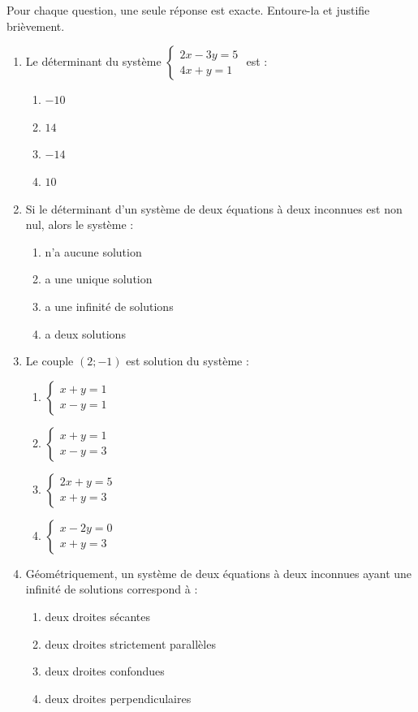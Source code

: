 \documentclass[11pt]{article}
\begin{document}
\begin{exercice}
Pour chaque question, une seule réponse est exacte. Entoure-la et justifie brièvement.
\begin{enumerate}
\item Le déterminant du système $\begin{cases} 2x - 3y = 5 \\ 4x + y = 1 \end{cases}$ est :
\begin{enumerate}
\item $-10$ \quad \item $14$ \quad \item $-14$ \quad \item $10$
\end{enumerate}
\item Si le déterminant d'un système de deux équations à deux inconnues est non nul, alors le système :
\begin{enumerate}
\item n'a aucune solution \quad \item a une unique solution \quad \item a une infinité de solutions \quad \item a deux solutions
\end{enumerate}
\item Le couple $(2 ; -1)$ est solution du système :
\begin{enumerate}
\item $\begin{cases} x + y = 1 \\ x - y = 1 \end{cases}$ \quad \item $\begin{cases} x + y = 1 \\ x - y = 3 \end{cases}$ \quad \item $\begin{cases} 2x + y = 5 \\ x + y = 3 \end{cases}$ \quad \item $\begin{cases} x - 2y = 0 \\ x + y = 3 \end{cases}$
\end{enumerate}
\item Géométriquement, un système de deux équations à deux inconnues ayant une infinité de solutions correspond à :
\begin{enumerate}
\item deux droites sécantes \quad \item deux droites strictement parallèles \quad \item deux droites confondues \quad \item deux droites perpendiculaires
\end{enumerate}
\end{enumerate}
\end{exercice}
\end{document}
